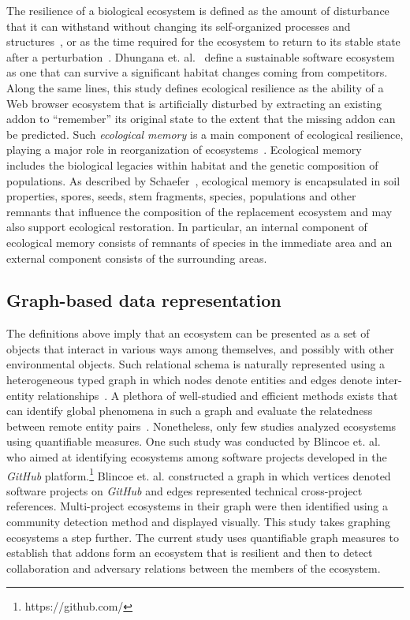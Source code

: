\documentclass[10pt,letterpaper]{article}
\begin{document}
The resilience of a biological ecosystem is defined as the amount of disturbance that it can withstand without changing its self-organized processes and structures~\cite{holling1973resilience}, or as the time required for the ecosystem to return to its stable state after a perturbation~\cite{tilman1996biodiversity}. Dhungana et. al.~\cite{dhungana2010software} define a sustainable software ecosystem as one that can survive a significant habitat changes coming from competitors. Along the same lines, this study defines ecological resilience as the ability of a Web browser ecosystem that is artificially disturbed by extracting an existing addon to ``remember'' its original state to the extent that the missing addon can be predicted. Such \textit{ecological memory} is a main component of ecological resilience, playing a major role in reorganization of ecosystems~\cite{gunderson2000ecological}. Ecological memory includes the biological legacies within habitat and the genetic composition of populations. As described by Schaefer~\cite{schaefer2009alien}, ecological memory is encapsulated in soil properties, spores, seeds, stem fragments, species, populations and other remnants that influence the composition of the replacement ecosystem and may also support ecological restoration. In particular, an internal component of ecological memory consists of remnants of species in the immediate area and an external component consists of the surrounding areas. 

\subsection*{Graph-based data representation}

The definitions above imply that an ecosystem can be presented as a set of objects that interact in various ways among themselves, and possibly with other environmental objects. Such relational schema is naturally represented using a heterogeneous typed graph in which nodes denote entities and edges denote inter-entity relationships~\cite{minkov2010improving,sunWSDM12}. A plethora of well-studied and efficient methods exists that can identify global phenomena in such a graph and evaluate the relatedness between remote entity pairs~\cite{kleinberg07,sun12}. Nonetheless, only few studies analyzed ecosystems using quantifiable measures. One such study was conducted by Blincoe et. al.~\cite{blincoeMSR15} who aimed at identifying ecosystems among software projects developed in the \textit{GitHub} platform.\footnote{ https://github.com/} Blincoe et. al. constructed a graph in which vertices denoted software projects on \textit{GitHub} and edges represented technical cross-project references. Multi-project ecosystems in their graph were then identified using a community detection method and displayed visually. This study takes graphing ecosystems a step further. The current study uses quantifiable graph measures to establish that addons form an ecosystem that is resilient and then to detect collaboration and adversary relations between the members of the ecosystem.
\end{document}
